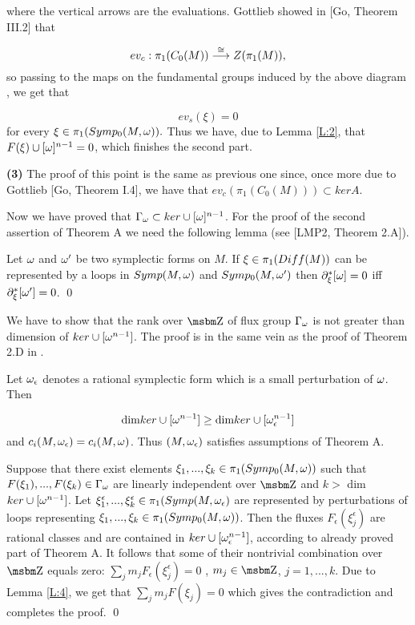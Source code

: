 \bigskip
\noindent
where the vertical arrows are the evaluations. Gottlieb showed
in [Go, Theorem III.2] that 

$$ev_c:\pi _1(C_0(M))\stackrel {\cong }\longrightarrow Z(\pi _1(M)),$$
so passing to the maps on the fundamental groups induced by the above diagram
, we get that 

$$ev_s(\xi )=0$$
 for every $\xi \in \pi _1(Symp_0(M,\omega)) .$
Thus we have, due to Lemma \ref{L:2}, that
$F(\xi )\cup [\omega ]^{n-1}=0$, which finishes the second part.

{\bf (3)} The proof of this point is the same as previous one since,
once more due to Gottlieb [Go, Theorem I.4], we have that
$ev_c(\pi _1(C_0(M)))\subset ker A$.

Now we have proved that $\Gamma _{\omega } \subset ker \cup [\omega ]^{n-1}$.
For the proof of the second assertion of Theorem A we need the
following lemma (see [LMP2, Theorem 2.A]).

\bigskip

\begin{Lem} \label{L:4}
Let $\omega $ and $\omega ^{\prime }$ be two symplectic forms on $M$. 
If $\xi \in \pi _1(Diff(M)) $ can
be represented by a loops in $Symp(M,\omega) $ and $Symp_0(M,\omega ^{\prime })$
then $\partial _\xi ^*[\omega ]=0$ iff $\partial _\xi ^*[\omega ^{\prime }]=0$. 
\qed
\end{Lem}

We have to show
that  the rank over $\B Z$
of flux group $\Gamma _{\omega }$ is not greater than dimension of 
$ker\cup [\omega ^{n-1}]$. The proof is in the same vein as the proof
of Theorem 2.D  in 
\cite{lmp99}.

Let $\omega _\epsilon $ denotes a rational symplectic form which
is a small perturbation of $\omega $. Then
 
$$\hbox {dim} ker\cup [\omega ^{n-1}]\geq \hbox {dim} ker\cup[\omega _\epsilon ^{n-1}]$$
and 
$c_i(M,\omega _\epsilon )=c_i(M,\omega) $. 
Thus $(M,\omega _\epsilon )$ satisfies assumptions of Theorem A.

Suppose that there exist elements $\xi _1,...,\xi _k \in \pi _1(Symp_0(M,\omega))$
such that $F(\xi _1),..., F(\xi _k) \in \Gamma _{\omega }$
are linearly independent over $\B Z$ and
$k>$ dim $ker\cup [\omega ^{n-1}]$.
Let 
$\xi _1^{\epsilon },...,\xi _k^{\epsilon }\in \pi _1(Symp(M,\omega _\epsilon )$
are represented by  perturbations of loops representing 
$\xi _1,...,\xi _k \in \pi _1(Symp_0(M,\omega))$.
Then the fluxes 
$F_{\epsilon }(\xi _j^{\epsilon })$ 
are rational classes and
are contained in 
$ker\cup[\omega _\epsilon ^{n-1}]$, according to already
proved part of Theorem A. 
It follows that some of their
nontrivial combination over $\B Z$ equals zero: 
$\sum _j m_jF_{\epsilon }(\xi _j^{\epsilon })=0$
, $m_j\in \B Z$, $j=1,...,k$.
Due to Lemma \ref{L:4}, we get that
$\sum _j m_j F(\xi _j)=0$ 
which gives the contradiction and completes the proof. 
\qed

